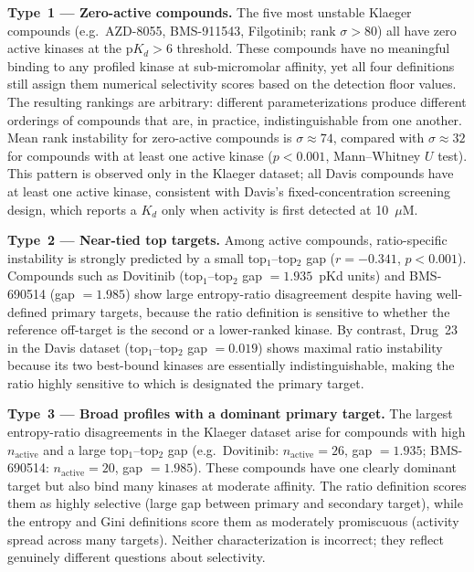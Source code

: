 \documentclass[journal=jcisd8,manuscript=article]{achemso}
\begin{document}
\textbf{Type~1 --- Zero-active compounds.}
The five most unstable Klaeger compounds (e.g.\ AZD-8055, BMS-911543,
Filgotinib; rank $\sigma > 80$) all have zero active kinases at the
$\mathrm{p}K_d > 6$ threshold.
These compounds have no meaningful binding to any profiled kinase at
sub-micromolar affinity, yet all four definitions still assign them numerical
selectivity scores based on the detection floor values.
The resulting rankings are arbitrary: different parameterizations produce
different orderings of compounds that are, in practice,
indistinguishable from one another.
Mean rank instability for zero-active compounds is $\sigma \approx 74$,
compared with $\sigma \approx 32$ for compounds with at least one active
kinase ($p < 0.001$, Mann--Whitney $U$ test).
This pattern is observed only in the Klaeger dataset; all Davis compounds
have at least one active kinase, consistent with Davis's fixed-concentration
screening design, which reports a $K_d$ only when activity is first detected
at 10~$\mu$M.

\textbf{Type~2 --- Near-tied top targets.}
Among active compounds, ratio-specific instability is strongly predicted by a
small top$_1$--top$_2$ gap ($r = -0.341$, $p < 0.001$).
Compounds such as Dovitinib (top$_1$--top$_2$ gap $= 1.935$~pKd units) and
BMS-690514 (gap $= 1.985$) show large entropy-ratio disagreement despite
having well-defined primary targets, because the ratio definition is sensitive
to whether the reference off-target is the second or a lower-ranked kinase.
By contrast, Drug~23 in the Davis dataset (top$_1$--top$_2$ gap $= 0.019$)
shows maximal ratio instability because its two best-bound kinases are
essentially indistinguishable, making the ratio highly sensitive to which is
designated the primary target.

\textbf{Type~3 --- Broad profiles with a dominant primary target.}
The largest entropy-ratio disagreements in the Klaeger dataset arise for
compounds with high $n_\mathrm{active}$ and a large top$_1$--top$_2$ gap
(e.g.\ Dovitinib: $n_\mathrm{active} = 26$, gap $= 1.935$;
BMS-690514: $n_\mathrm{active} = 20$, gap $= 1.985$).
These compounds have one clearly dominant target but also bind many kinases at
moderate affinity.
The ratio definition scores them as highly selective (large gap between primary
and secondary target), while the entropy and Gini definitions score them as
moderately promiscuous (activity spread across many targets).
Neither characterization is incorrect; they reflect genuinely different
questions about selectivity.
\end{document}
